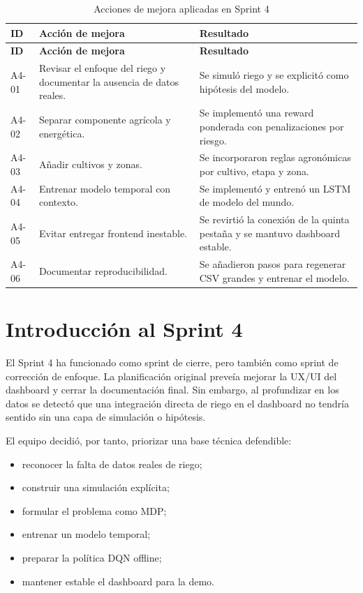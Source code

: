 \documentclass[11pt,a4paper]{article}
\begin{document}
\begin{longtable}{p{}p{}p{}}
\caption{Acciones de mejora aplicadas en Sprint 4}\\
\toprule
\textbf{ID} & \textbf{Acción de mejora} & \textbf{Resultado} \\
\midrule
\endfirsthead
\toprule
\textbf{ID} & \textbf{Acción de mejora} & \textbf{Resultado} \\
\midrule
\endhead
A4-01 & Revisar el enfoque del riego y documentar la ausencia de datos reales. & Se simuló riego y se explicitó como hipótesis del modelo. \\
A4-02 & Separar componente agrícola y energética. & Se implementó una reward ponderada con penalizaciones por riesgo. \\
A4-03 & Añadir cultivos y zonas. & Se incorporaron reglas agronómicas por cultivo, etapa y zona. \\
A4-04 & Entrenar modelo temporal con contexto. & Se implementó y entrenó un LSTM de modelo del mundo. \\
A4-05 & Evitar entregar frontend inestable. & Se revirtió la conexión de la quinta pestaña y se mantuvo dashboard estable. \\
A4-06 & Documentar reproducibilidad. & Se añadieron pasos para regenerar CSV grandes y entrenar el modelo. \\
\bottomrule
\end{longtable}

\newpage

\section{Introducción al Sprint 4}

El Sprint 4 ha funcionado como sprint de cierre, pero también como sprint de corrección de enfoque. La planificación original preveía mejorar la UX/UI del dashboard y cerrar la documentación final. Sin embargo, al profundizar en los datos se detectó que una integración directa de riego en el dashboard no tendría sentido sin una capa de simulación o hipótesis.

El equipo decidió, por tanto, priorizar una base técnica defendible:

\begin{itemize}
    \item reconocer la falta de datos reales de riego;
    \item construir una simulación explícita;
    \item formular el problema como MDP;
    \item entrenar un modelo temporal;
    \item preparar la política DQN offline;
    \item mantener estable el dashboard para la demo.
\end{itemize}
\end{document}

